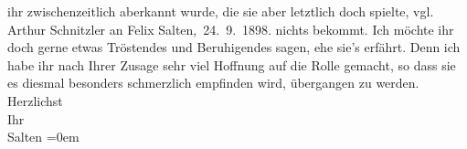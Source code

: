 \begin{ledgroupsized}[t]{13cm}
{{{                  ihr zwischenzeitlich aberkannt wurde, die sie aber letztlich doch spielte, 
                   vgl. Arthur Schnitzler an Felix Salten, 24. 9. 1898.}}}\label{K_L03284-2h} nichts bekommt. Ich möchte
               ihr doch gerne etwas Tröstendes und Beruhigendes sagen, ehe sie’s erfährt. Denn ich
               habe ihr nach Ihrer Zusage sehr viel Hoffnung auf die Rolle gemacht, so dass  sie es diesmal besonders schmerzlich empfinden wird,
               übergangen zu werden.\pend
           \pstart
           Herzlichst {\\[\baselineskip]}Ihr {\\[\baselineskip]}\spacefill\mbox{Salten}\pend
           \leftskip=0em{}
         
         \endnumbering{}\end{ledgroupsized}  \newcommand{\dateiname}{L03284}\newcommand{\titel}{Felix Salten an Arthur Schnitzler, 23. 9. 1898}\newcommand{\editorInnen}{Martin Anton Müller und Laura Untner}
      